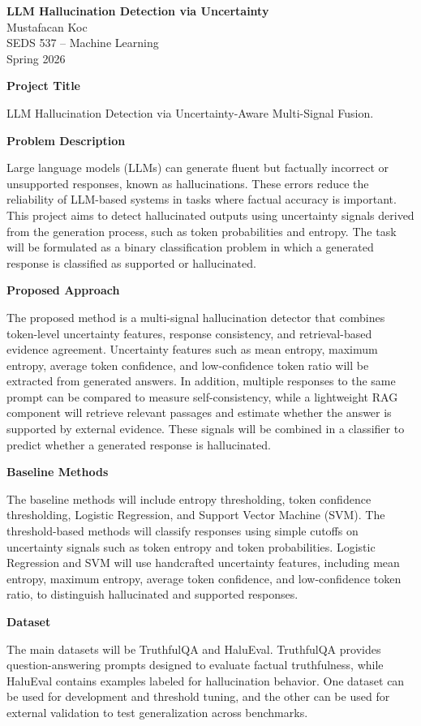 \documentclass[10pt]{article}
\newcommand{\proposalsection}[1]{\vspace{2pt}\textbf{\normalsize #1}\par}
\begin{document}
\begin{center}
{\large \textbf{LLM Hallucination Detection via Uncertainty}}\\
Mustafacan Koc\\
SEDS 537 -- Machine Learning\\
Spring 2026
\end{center}

\proposalsection{Project Title}
LLM Hallucination Detection via Uncertainty-Aware Multi-Signal Fusion.

\proposalsection{Problem Description}
Large language models (LLMs) can generate fluent but factually incorrect or unsupported responses, known as hallucinations. These errors reduce the reliability of LLM-based systems in tasks where factual accuracy is important. This project aims to detect hallucinated outputs using uncertainty signals derived from the generation process, such as token probabilities and entropy. The task will be formulated as a binary classification problem in which a generated response is classified as supported or hallucinated.

\proposalsection{Proposed Approach}
The proposed method is a multi-signal hallucination detector that combines token-level uncertainty features, response consistency, and retrieval-based evidence agreement. Uncertainty features such as mean entropy, maximum entropy, average token confidence, and low-confidence token ratio will be extracted from generated answers. In addition, multiple responses to the same prompt can be compared to measure self-consistency, while a lightweight RAG component will retrieve relevant passages and estimate whether the answer is supported by external evidence. These signals will be combined in a classifier to predict whether a generated response is hallucinated.

\proposalsection{Baseline Methods}
The baseline methods will include entropy thresholding, token confidence thresholding, Logistic Regression, and Support Vector Machine (SVM). The threshold-based methods will classify responses using simple cutoffs on uncertainty signals such as token entropy and token probabilities. Logistic Regression and SVM will use handcrafted uncertainty features, including mean entropy, maximum entropy, average token confidence, and low-confidence token ratio, to distinguish hallucinated and supported responses.

\proposalsection{Dataset}
The main datasets will be TruthfulQA and HaluEval. TruthfulQA provides question-answering prompts designed to evaluate factual truthfulness, while HaluEval contains examples labeled for hallucination behavior. One dataset can be used for development and threshold tuning, and the other can be used for external validation to test generalization across benchmarks.
\end{document}
